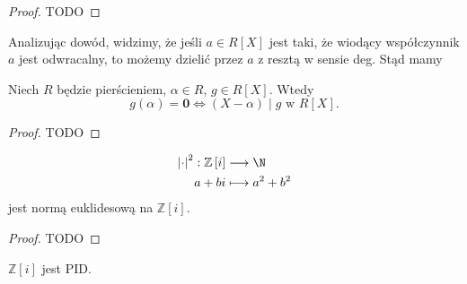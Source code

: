 \begin{proof}
	TODO
\end{proof} 
\begin{remark}
	Analizując dowód, widzimy, że jeśli $a \in R\left[ X \right] $ jest taki, że wiodący współczynnik $a$ jest odwracalny, to możemy dzielić przez $a$ z resztą w sensie deg. Stąd mamy
\end{remark} 
\begin{theorem}[Bezout]
	Niech $R$ będzie pierścieniem, $\alpha \in R$, $g\in R\left[ X \right] $. Wtedy 
	 \[
	g\left( \alpha  \right) = \mathbf{0} \iff \left( X - \alpha  \right) \mid g \text{ w } R\left[ X \right] 
	.\] 
\end{theorem} 
\begin{proof}
	TODO
\end{proof} 
\begin{theorem}
	\begin{align*}
		\left| \cdot  \right| ^2: \mathbb{Z} \left[ i \right]  &\longrightarrow \N \\
		a+bi &\longmapsto a^2+b^2
	\end{align*}
	jest normą euklidesową na $\mathbb{Z} \left[ i \right] $.
\end{theorem} 
\begin{proof}
	TODO
\end{proof} 
\begin{corollary}

	$\mathbb{Z} \left[ i \right] $ jest PID.
\end{corollary}
